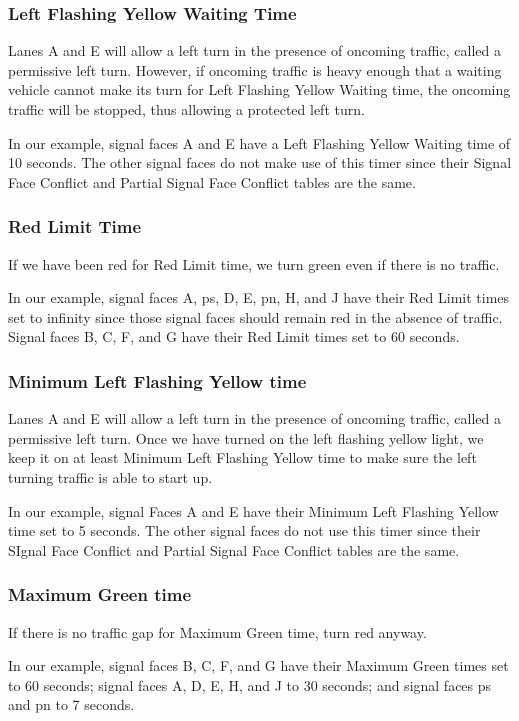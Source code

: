 \documentclass[letterpaper,twoside]{article}
\begin{document}
\subsubsection{Left Flashing Yellow Waiting Time}
Lanes A and E will allow a left turn in the presence of oncoming traffic,
called a permissive left turn.
However, if oncoming traffic is heavy enough that a waiting vehicle
cannot make its turn for Left Flashing Yellow Waiting time, the oncoming
traffic will be stopped, thus allowing a protected left turn.

In our example, signal faces A and E have a Left Flashing Yellow Waiting time
of 10 seconds.  The other signal faces do not make use of this timer
since their Signal Face Conflict and Partial Signal Face
Conflict tables are the same.

\subsubsection{Red Limit Time}
If we have been red for Red Limit time, we turn green even if there is
no traffic.

In our example, signal faces A, ps, D, E, pn, H, and J have their
Red Limit times set to infinity since those signal faces should
remain red in the absence of traffic.
Signal faces B, C, F, and G have their Red Limit times set to 60 seconds.

\subsubsection{Minimum Left Flashing Yellow time}
Lanes A and E will allow a left turn in the presence of oncoming traffic,
called a permissive left turn.  Once we have turned on the left flashing
yellow light, we keep it on at least Minimum Left Flashing Yellow time
to make sure the left turning traffic is able to start up.

In our example, signal Faces A and E have their Minimum Left Flashing Yellow
time set to 5 seconds.  The other signal faces do not use this timer
since their SIgnal Face Conflict and Partial Signal Face Conflict
tables are the same.

\subsubsection{Maximum Green time}
If there is no traffic gap for Maximum Green time, turn red anyway.

In our example, signal faces B, C, F, and G have their Maximum Green
times set to 60 seconds; signal faces A, D, E, H, and J to 30 seconds;
and signal faces ps and pn to 7 seconds.
\end{document}
